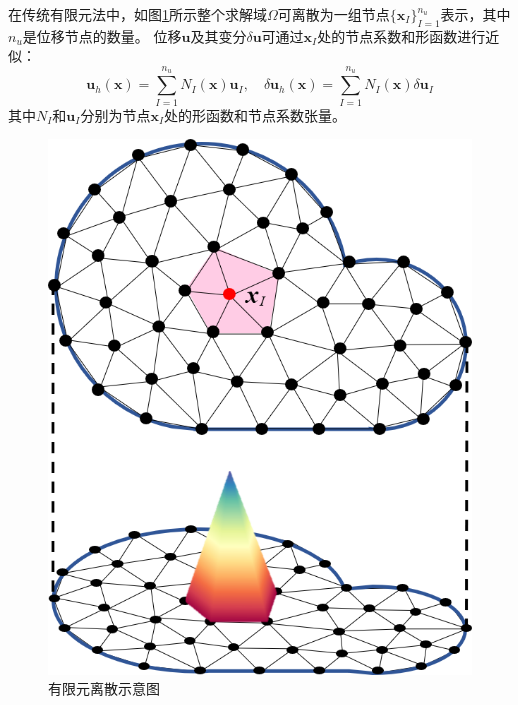 在传统有限元法中，如图\ref{fem}所示整个求解域$\Omega$可离散为一组节点$\{\boldsymbol x_I\}_{I=1}^{n_u}$表示\cite{hughes2000}，其中$n_u$是位移节点的数量。
位移$\boldsymbol u$及其变分$\delta \boldsymbol u $可通过$\boldsymbol x_I$处的节点系数和形函数进行近似：
\begin{equation}\label{u_h}
    \boldsymbol u_h(\boldsymbol x) = \sum_{I=1}^{n_u} N_I(\boldsymbol x) \boldsymbol u_I, \quad
    \delta \boldsymbol u_h(\boldsymbol x) = \sum_{I=1}^{n_u} N_I(\boldsymbol x) \delta \boldsymbol u_I
\end{equation}
其中$N_I$和$\boldsymbol u_I$分别为节点$\boldsymbol{x}_I$处的形函数和节点系数张量。
\begin{figure}[H]
    \centering 
        \includegraphics[scale=0.6]{figures/fem.png}
        \caption{有限元离散示意图}\label{fem}
\end{figure}

